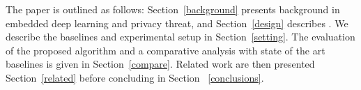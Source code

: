 The paper is outlined as follows: Section~\ref{background} presents background in embedded deep learning and privacy threat, and Section~\ref{design} describes \method\hspace{0.02in}.
We describe the baselines and experimental setup in Section~\ref{setting}.
The evaluation of the proposed algorithm and a comparative analysis with state of the art baselines is given in Section~\ref{compare}.
Related work are then presented Section~\ref{related} before concluding in Section ~\ref{conclusions}.
